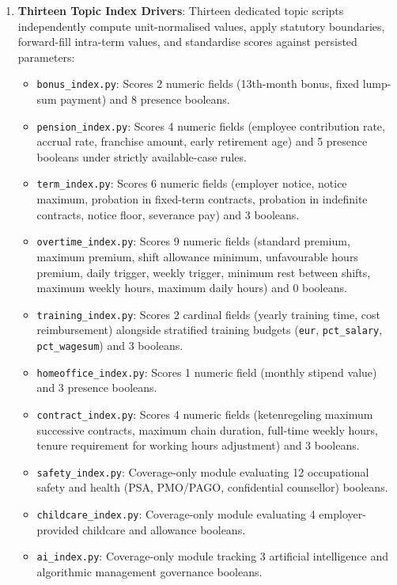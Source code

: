 \begin{enumerate}[leftmargin=1.8em]
  \item \textbf{Thirteen Topic Index Drivers}:
    Thirteen dedicated topic scripts independently compute unit-normalised values, apply statutory boundaries, forward-fill intra-term values, and standardise scores against persisted parameters:
    \begin{itemize}[leftmargin=1.2em]
      \item \nolinkurl{bonus_index.py}: Scores 2 numeric fields (13th-month bonus, fixed lump-sum payment) and 8 presence booleans.
      \item \nolinkurl{pension_index.py}: Scores 4 numeric fields (employee contribution rate, accrual rate, franchise amount, early retirement age) and 5 presence booleans under strictly available-case rules.
      \item \nolinkurl{term_index.py}: Scores 6 numeric fields (employer notice, notice maximum, probation in fixed-term contracts, probation in indefinite contracts, notice floor, severance pay) and 3 booleans.
      \item \nolinkurl{overtime_index.py}: Scores 9 numeric fields (standard premium, maximum premium, shift allowance minimum, unfavourable hours premium, daily trigger, weekly trigger, minimum rest between shifts, maximum weekly hours, maximum daily hours) and 0 booleans.
      \item \nolinkurl{training_index.py}: Scores 2 cardinal fields (yearly training time, cost reimbursement) alongside stratified training budgets (\nolinkurl{eur}, \nolinkurl{pct_salary}, \nolinkurl{pct_wagesum}) and 3 booleans.
      \item \nolinkurl{homeoffice_index.py}: Scores 1 numeric field (monthly stipend value) and 3 presence booleans.
      \item \nolinkurl{contract_index.py}: Scores 4 numeric fields (ketenregeling maximum successive contracts, maximum chain duration, full-time weekly hours, tenure requirement for working hours adjustment) and 3 booleans.
      \item \nolinkurl{safety_index.py}: Coverage-only module evaluating 12 occupational safety and health (PSA, PMO/PAGO, confidential counsellor) booleans.
      \item \nolinkurl{childcare_index.py}: Coverage-only module evaluating 4 employer-provided childcare and allowance booleans.
      \item \nolinkurl{ai_index.py}: Coverage-only module tracking 3 artificial intelligence and algorithmic management governance booleans.

\end{itemize}
\end{enumerate}
